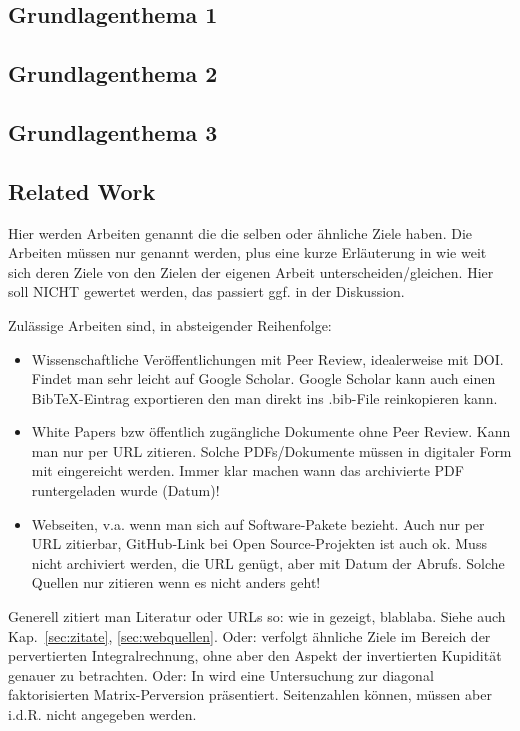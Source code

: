 \documentclass[12pt,oneside]{article}
\begin{document}
\subsection{Grundlagenthema 1}\label{sec:grundlagen1}
\subsection{Grundlagenthema 2}\label{sec:grundlagen2}
\subsection{Grundlagenthema 3}\label{sec:grundlagen3}
%
\subsection{Related Work}\label{sec:relwork}
Hier werden Arbeiten genannt die die selben oder ähnliche Ziele haben. Die Arbeiten müssen nur genannt werden, plus eine kurze Erläuterung in wie weit sich deren Ziele von den Zielen der eigenen Arbeit unterscheiden/gleichen. Hier soll NICHT gewertet werden, das passiert ggf. in der Diskussion.

Zulässige Arbeiten sind, in absteigender Reihenfolge:
\begin{itemize}
\item Wissenschaftliche Veröffentlichungen mit Peer Review, idealerweise mit DOI. Findet man sehr leicht auf Google Scholar. Google Scholar kann auch einen BibTeX-Eintrag exportieren den man direkt ins .bib-File reinkopieren kann.
\item White Papers bzw öffentlich zugängliche Dokumente ohne Peer Review. Kann man nur per URL zitieren. Solche PDFs/Dokumente müssen in digitaler Form mit eingereicht werden. Immer klar machen wann das archivierte PDF runtergeladen wurde (Datum)!
\item Webseiten, v.a. wenn man sich auf Software-Pakete bezieht. Auch nur per URL zitierbar, GitHub-Link bei Open Source-Projekten ist auch ok. Muss nicht archiviert werden, die URL genügt, aber mit Datum der Abrufs. Solche Quellen nur zitieren wenn es nicht anders geht!
\end{itemize}

Generell zitiert man Literatur oder URLs so: wie in \cite{clemen1989combining} gezeigt, blablaba. Siehe auch Kap.~\ref{sec:zitate}, \ref{sec:webquellen}. Oder: \cite{clemen1989combining} verfolgt ähnliche Ziele im Bereich der pervertierten Integralrechnung, ohne aber den Aspekt der invertierten Kupidität genauer zu betrachten. Oder: In \cite{clemen1989combining} wird eine Untersuchung zur diagonal faktorisierten Matrix-Perversion präsentiert. Seitenzahlen können, müssen aber i.d.R. nicht angegeben werden.
\end{document}
